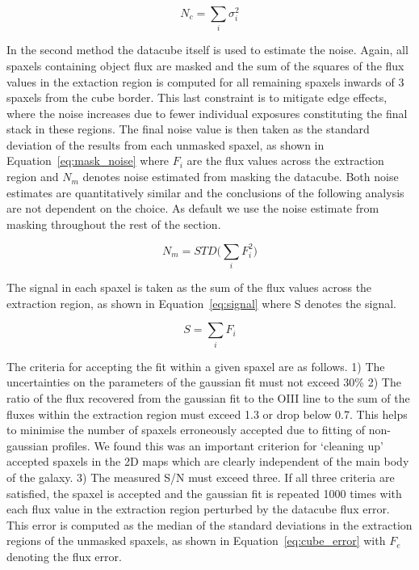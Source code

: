 \documentclass[a4paper,fleqn,usenatbib]{mn2e}
\begin{document}
\begin{equation}\label{eq:cube_noise}
   N_{c} = \sum_{i}\sigma _{i}^{2}
\end{equation}

In the second method the datacube itself is used to estimate the noise.
Again, all spaxels containing object flux are masked and the sum of the squares of the flux values in the extaction region is computed for all remaining spaxels inwards of 3 spaxels from the cube border.
This last constraint is to mitigate edge effects, where the noise increases due to fewer individual exposures constituting the final stack in these regions.
The final noise value is then taken as the standard deviation of the results from each unmasked spaxel, as shown in Equation~\ref{eq:mask_noise} where $F_{i}$ are the flux values across the extraction region and $N_{m}$ denotes noise estimated from masking the datacube.
Both noise estimates are quantitatively similar and the conclusions of the following analysis are not dependent on the choice.
As default we use the noise estimate from masking throughout the rest of the section.

\begin{equation}\label{eq:mask_noise}
    N_{m} = STD\big(\sum_{i}F_{i}^{2}\big)
\end{equation}

The signal in each spaxel is taken as the sum of the flux values across the extraction region, as shown in Equation~\ref{eq:signal} where S denotes the signal.

\begin{equation}\label{eq:signal}
    S = \sum_{i}F_{i}
\end{equation}

The criteria for accepting the fit within a given spaxel are as follows.
1) The uncertainties on the parameters of the gaussian fit must not exceed 30\%
2) The ratio of the flux recovered from the gaussian fit to the OIII line to the sum of the fluxes within the extraction region must exceed 1.3 or drop below 0.7.
This helps to minimise the number of spaxels erroneously accepted due to fitting of non-gaussian profiles.
We found this was an important criterion for `cleaning up' accepted spaxels in the 2D maps which are clearly independent of the main body of the galaxy.
3) The measured S/N must exceed three.
If all three criteria are satisfied, the spaxel is accepted and the gaussian fit is repeated 1000 times with each flux value in the extraction region perturbed by the datacube flux error.
This error is computed as the median of the standard deviations in the extraction regions of the unmasked spaxels, as shown in Equation~\ref{eq:cube_error} with $F_{e}$ denoting the flux error.  
\end{document}
